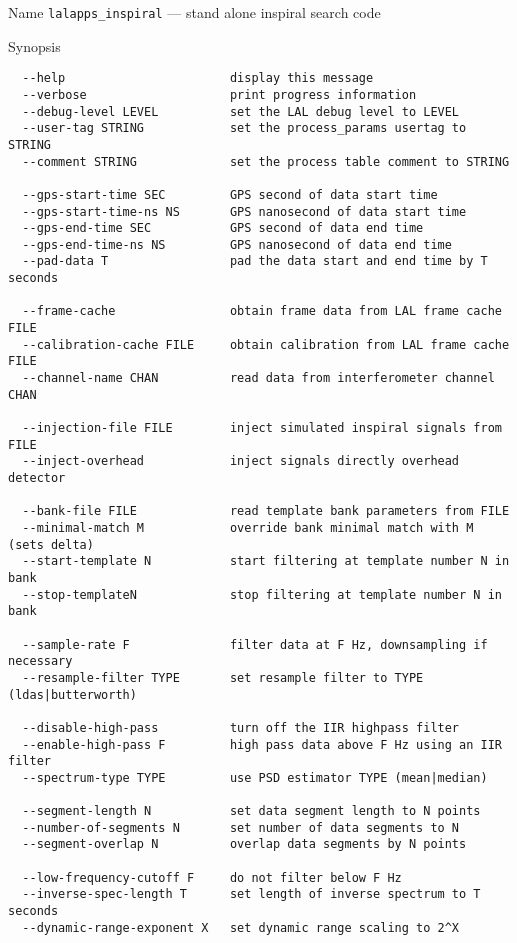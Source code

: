 \begin{entry}
\item[Name]
\verb$lalapps_inspiral$ --- stand alone inspiral search code

\item[Synopsis]
\begin{verbatim}
  --help                       display this message
  --verbose                    print progress information
  --debug-level LEVEL          set the LAL debug level to LEVEL
  --user-tag STRING            set the process_params usertag to STRING
  --comment STRING             set the process table comment to STRING

  --gps-start-time SEC         GPS second of data start time
  --gps-start-time-ns NS       GPS nanosecond of data start time
  --gps-end-time SEC           GPS second of data end time
  --gps-end-time-ns NS         GPS nanosecond of data end time
  --pad-data T                 pad the data start and end time by T seconds

  --frame-cache                obtain frame data from LAL frame cache FILE
  --calibration-cache FILE     obtain calibration from LAL frame cache FILE
  --channel-name CHAN          read data from interferometer channel CHAN

  --injection-file FILE        inject simulated inspiral signals from FILE
  --inject-overhead            inject signals directly overhead detector

  --bank-file FILE             read template bank parameters from FILE
  --minimal-match M            override bank minimal match with M (sets delta)
  --start-template N           start filtering at template number N in bank
  --stop-templateN             stop filtering at template number N in bank

  --sample-rate F              filter data at F Hz, downsampling if necessary
  --resample-filter TYPE       set resample filter to TYPE (ldas|butterworth)

  --disable-high-pass          turn off the IIR highpass filter
  --enable-high-pass F         high pass data above F Hz using an IIR filter
  --spectrum-type TYPE         use PSD estimator TYPE (mean|median)

  --segment-length N           set data segment length to N points
  --number-of-segments N       set number of data segments to N
  --segment-overlap N          overlap data segments by N points

  --low-frequency-cutoff F     do not filter below F Hz
  --inverse-spec-length T      set length of inverse spectrum to T seconds
  --dynamic-range-exponent X   set dynamic range scaling to 2^X


\end{verbatim}
\end{entry}
